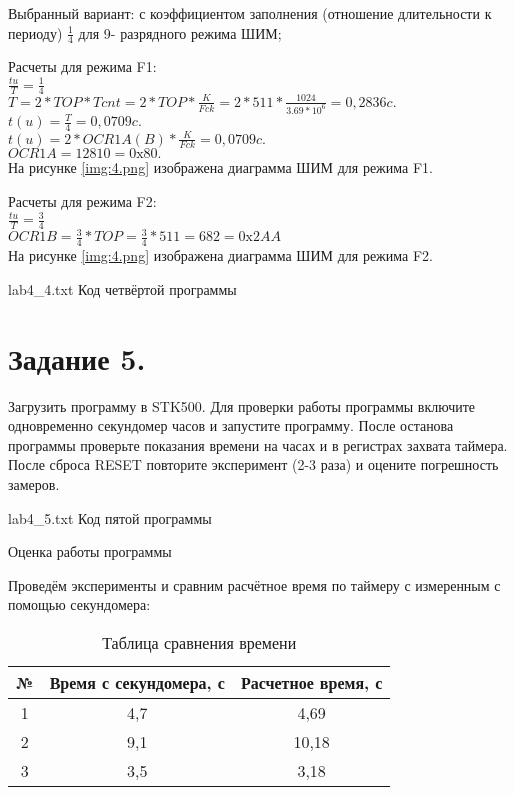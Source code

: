 \documentclass{bmstu}
\begin{document}
Выбранный вариант: с коэффициентом заполнения (отношение длительности к периоду) $\frac{1}{4}$ для 9- разрядного режима ШИМ; 

Расчеты для режима F1: \\
$\frac{tu}{T} = \frac{1}{4} $ \\
$T = 2*TOP*Tcnt = 2*TOP* \frac{K}{Fck} = 2*511*\frac{1024}{3.69 * 10^6} = 0,2836c. $ \\
$t(u)=\frac{T}{4} = 0,0709c. $ \\
$t(u) = 2*OCR1A(B) *\frac{K}{Fck} = 0,0709c.$ \\
$OCR1A = 12810 = 0\text{x}80.$\\

На рисунке \ref{img:4.png} изображена диаграмма ШИМ для режима F1.

Расчеты для режима F2: \\
$\frac{tu}{T} = \frac{3}{4} $ \\ 
$OCR1B = \frac{3}{4} * TOP= \frac{3}{4} * 511 = 682 = 0 \text{x} 2AA $ \\

На рисунке \ref{img:4.png} изображена диаграмма ШИМ для режима F2.

	{lab4_4.txt}
	{Код четвёртой программы}

\chapter{Задание 5.} 
Загрузить программу в STK500. Для проверки работы программы включите одновременно секундомер часов и запустите 
программу. После останова программы проверьте показания времени на часах и в регистрах захвата таймера. После 
сброса RESET повторите эксперимент (2-3 раза) и оцените погрешность замеров. 

	{lab4_5.txt}
	{Код пятой программы}



Оценка работы программы 

Проведём эксперименты и сравним расчётное время по таймеру с измеренным с помощью секундомера:

\begin{table}
\label{table:eq_table_2}
\caption{Таблица сравнения времени}
\begin{tabular} {|c|c|c|}
	\hline
		№ &Время с секундомера, с & Расчетное время, с \\
	\hline
		1 & 4,7 & 4,69 \\
	\hline
		2 & 9,1 & 10,18 \\
	\hline
		3 & 3,5 & 3,18 \\
	\hline	
\end{tabular}
\end{table}
\end{document}
